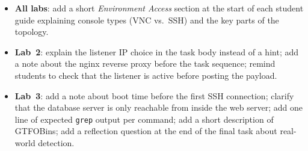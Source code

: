 \begin{itemize}
  \item \textbf{All labs}: add a short \textit{Environment Access} section
        at the start of each student guide explaining console types (VNC
        vs.\ SSH) and the key parts of the topology.
  \item \textbf{Lab~2}: explain the listener IP choice in the task body
        instead of a hint; add a note about the nginx reverse proxy before
        the task sequence; remind students to check that the listener is
        active before posting the payload.
  \item \textbf{Lab~3}: add a note about boot time before the first SSH
        connection; clarify that the database server is only reachable from
        inside the web server; add one line of expected \texttt{grep} output
        per command; add a short description of GTFOBins; add a reflection
        question at the end of the final task about real-world detection.
\end{itemize}
